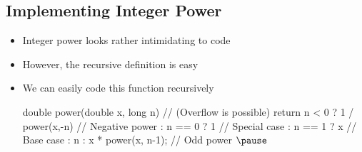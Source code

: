 
\begin{slide}
\section[-1]{Implementing Integer Power}

\begin{PauseHighLight}
  \begin{itemize}
  \item Integer power looks rather intimidating to code\pause
  \item However, the recursive definition is easy\pause
  \item We can easily code this function recursively
    \begin{java}
    double power(double x, long n)   //  (Overflow is possible)
    {
        return  n <  0  ? 1 / power(x,-n)          //  Negative power 
            :  n == 0   ? 1                        //  Special case
            :  n == 1   ? x                        //  Base case
            :  n%
            :              x * power(x, n-1);      //  Odd power
    }$\pause$
    \end{java}
  \end{itemize}
\end{PauseHighLight}
\end{slide}


